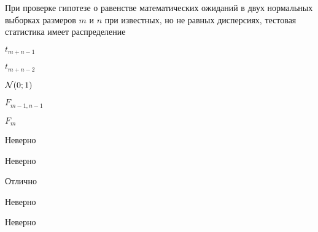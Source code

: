 
\begin{question}
При проверке гипотезе о равенстве математических ожиданий в двух
нормальных выборках размеров \(m\) и \(n\) при известных, но не равных
дисперсиях, тестовая статистика имеет распределение
\begin{answerlist}
  \item \(t_{m+n-1}\)
  \item \(t_{m+n-2}\)
  \item \(\mathcal{N}(0;1)\)
  \item \(F_{m-1,n-1}\)
  \item \(F_{m}\)
\end{answerlist}
\end{question}

\begin{solution}
\begin{answerlist}
  \item Неверно
  \item Неверно
  \item Отлично
  \item Неверно
  \item Неверно
\end{answerlist}
\end{solution}

